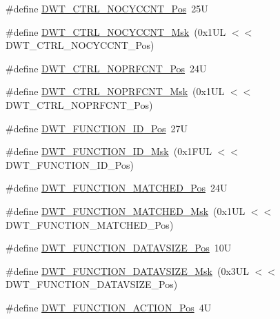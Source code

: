 \begin{DoxyCompactItemize}
\item 
\#define \mbox{\hyperlink{group___c_m_s_i_s___d_w_t_ga337f6167d960f57f12aa382ffecce522}{D\+W\+T\+\_\+\+C\+T\+R\+L\+\_\+\+N\+O\+C\+Y\+C\+C\+N\+T\+\_\+\+Pos}}~25U
\item 
\#define \mbox{\hyperlink{group___c_m_s_i_s___d_w_t_gaf40c8d7a4fd978034c137e90f714c143}{D\+W\+T\+\_\+\+C\+T\+R\+L\+\_\+\+N\+O\+C\+Y\+C\+C\+N\+T\+\_\+\+Msk}}~(0x1\+U\+L $<$$<$ D\+W\+T\+\_\+\+C\+T\+R\+L\+\_\+\+N\+O\+C\+Y\+C\+C\+N\+T\+\_\+\+Pos)
\item 
\#define \mbox{\hyperlink{group___c_m_s_i_s___d_w_t_gad52a0e5be84363ab166cc17beca0d048}{D\+W\+T\+\_\+\+C\+T\+R\+L\+\_\+\+N\+O\+P\+R\+F\+C\+N\+T\+\_\+\+Pos}}~24U
\item 
\#define \mbox{\hyperlink{group___c_m_s_i_s___d_w_t_gafd8448d7db4bc51f27f202e6e1f27823}{D\+W\+T\+\_\+\+C\+T\+R\+L\+\_\+\+N\+O\+P\+R\+F\+C\+N\+T\+\_\+\+Msk}}~(0x1\+U\+L $<$$<$ D\+W\+T\+\_\+\+C\+T\+R\+L\+\_\+\+N\+O\+P\+R\+F\+C\+N\+T\+\_\+\+Pos)
\item 
\#define \mbox{\hyperlink{group___c_m_s_i_s___d_w_t_gae5dfe4049c2291e413f8713d7bd2bb1b}{D\+W\+T\+\_\+\+F\+U\+N\+C\+T\+I\+O\+N\+\_\+\+I\+D\+\_\+\+Pos}}~27U
\item 
\#define \mbox{\hyperlink{group___c_m_s_i_s___d_w_t_ga6bc2e15fcc300f511f64dad561c97582}{D\+W\+T\+\_\+\+F\+U\+N\+C\+T\+I\+O\+N\+\_\+\+I\+D\+\_\+\+Msk}}~(0x1\+F\+U\+L $<$$<$ D\+W\+T\+\_\+\+F\+U\+N\+C\+T\+I\+O\+N\+\_\+\+I\+D\+\_\+\+Pos)
\item 
\#define \mbox{\hyperlink{group___c_m_s_i_s___d_w_t_ga22c5787493f74a6bacf6ffb103a190ba}{D\+W\+T\+\_\+\+F\+U\+N\+C\+T\+I\+O\+N\+\_\+\+M\+A\+T\+C\+H\+E\+D\+\_\+\+Pos}}~24U
\item 
\#define \mbox{\hyperlink{group___c_m_s_i_s___d_w_t_gac8b1a655947490280709037808eec8ac}{D\+W\+T\+\_\+\+F\+U\+N\+C\+T\+I\+O\+N\+\_\+\+M\+A\+T\+C\+H\+E\+D\+\_\+\+Msk}}~(0x1\+U\+L $<$$<$ D\+W\+T\+\_\+\+F\+U\+N\+C\+T\+I\+O\+N\+\_\+\+M\+A\+T\+C\+H\+E\+D\+\_\+\+Pos)
\item 
\#define \mbox{\hyperlink{group___c_m_s_i_s___d_w_t_ga0517a186d4d448aa6416440f40fe7a4d}{D\+W\+T\+\_\+\+F\+U\+N\+C\+T\+I\+O\+N\+\_\+\+D\+A\+T\+A\+V\+S\+I\+Z\+E\+\_\+\+Pos}}~10U
\item 
\#define \mbox{\hyperlink{group___c_m_s_i_s___d_w_t_gaab42cbc1e6084c44d5de70971613ea76}{D\+W\+T\+\_\+\+F\+U\+N\+C\+T\+I\+O\+N\+\_\+\+D\+A\+T\+A\+V\+S\+I\+Z\+E\+\_\+\+Msk}}~(0x3\+U\+L $<$$<$ D\+W\+T\+\_\+\+F\+U\+N\+C\+T\+I\+O\+N\+\_\+\+D\+A\+T\+A\+V\+S\+I\+Z\+E\+\_\+\+Pos)
\item 
\#define \mbox{\hyperlink{group___c_m_s_i_s___d_w_t_ga00893dd43b824ca5be80e0235a237485}{D\+W\+T\+\_\+\+F\+U\+N\+C\+T\+I\+O\+N\+\_\+\+A\+C\+T\+I\+O\+N\+\_\+\+Pos}}~4U
$$
\end{DoxyCompactItemize}
